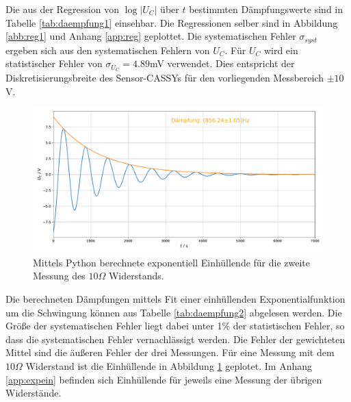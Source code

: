 \documentclass[a4paper, 12pt]{scrartcl}
\begin{document}
Die aus der Regression von $\log \lvert U_C \rvert$ über $t$ bestimmten Dämpfungswerte sind in Tabelle \ref{tab:daempfung1} einsehbar. Die Regressionen selber sind in Abbildung \ref{abb:reg1} und Anhang \ref{app:reg} geplottet. Die systematischen Fehler $\sigma_{syst}$ ergeben sich aus den systematischen Fehlern von $U_C$. Für $U_C$ wird ein statistischer Fehler von $\sigma_{U_C} = 4.89$mV verwendet. Dies entspricht der Diskretisierungsbreite des Sensor-CASSYs für den vorliegenden Messbereich $\pm 10$V.

\begin{figure}[h]
\centering
\includegraphics[width=\textwidth]{plots/einhuellend/exp_einhuellend3_2.pdf}
\caption{Mittels Python berechnete exponentiell Einhüllende für die zweite Messung des $10\Omega$ Widerstands.}
\label{abb:einhuellende1}
\end{figure}

Die berechneten Dämpfungen mittels Fit einer einhüllenden Exponentialfunktion um die Schwingung können aus Tabelle \ref{tab:daempfung2} abgelesen werden. Die Größe der systematischen Fehler liegt dabei unter 1\% der statistischen Fehler, so dass die systematischen Fehler vernachlässigt werden. Die Fehler der gewichteten Mittel sind die äußeren Fehler der drei Messungen. Für eine Messung mit dem $10\Omega$ Widerstand ist die Einhüllende in Abbildung \ref{abb:einhuellende1} geplotet. Im Anhang \ref{app:expein} befinden sich Einhüllende für jeweils eine Messung der übrigen Widerstände.
\end{document}
